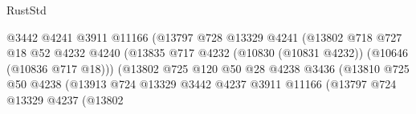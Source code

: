 \begin{lexlean}{RustStd}
\begin{coremodule}
                                                @3442
                                                @4241
                                                @3911
                                                @11166
                                                (@13797
                                                  @728
                                                  @13329
                                                  @4241
                                                  (@13802
                                                    @718
                                                    @727
                                                    @18
                                                    @52
                                                    @4232
                                                    @4240
                                                    (@13835
                                                      @717
                                                      @4232
                                                      (@10830 (@10831 @4232))
                                                      (@10646 (@10836 @717 @18)))
                                                    (@13802
                                                      @725
                                                      @120
                                                      @50
                                                      @28
                                                      @4238
                                                      @3436
                                                      (@13810
                                                        @725
                                                        @50
                                                        @4238
                                                        (@13913
                                                          @724
                                                          @13329
                                                          @3442
                                                          @4237
                                                          @3911
                                                          @11166
                                                          (@13797
                                                            @724
                                                            @13329
                                                            @4237
                                                            (@13802

\end{coremodule}
\end{lexlean}
